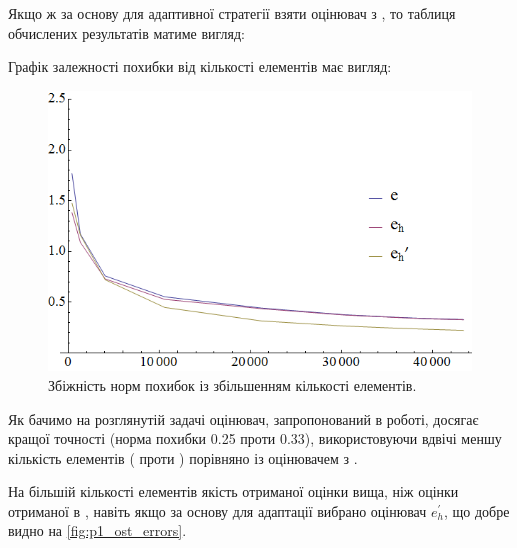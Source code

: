 Якщо ж за основу для адаптивної стратегії взяти оцінювач з \cite{OstShynAee11}, то таблиця обчислених результатів матиме вигляд:
%
\clearpage
{}

\clearpage
Графік залежності похибки від кількості елементів має вигляд:

\begin{figure}[H]
	\centering
    \includegraphics[width=\textwidth]{problem1/ost/Plotnb}
    \caption{Збіжність норм похибок із збільшенням кількості елементів.}
    \label{fig:p1_ost_errors}
\end{figure}

Як бачимо на розглянутій задачі оцінювач, запропонований в роботі, досягає кращої точності (норма похибки 0.25 проти 0.33), використовуючи вдвічі меншу кількість елементів ( проти ) порівняно із оцінювачем з \cite{OstShynAee11}.

На більшій кількості елементів якість отриманої оцінки вища, ніж оцінки отриманої в \cite{OstShynAee11},
навіть якщо за основу для адаптації вибрано оцінювач $e_h^\prime$, що добре видно на \autoref{fig:p1_ost_errors}.
